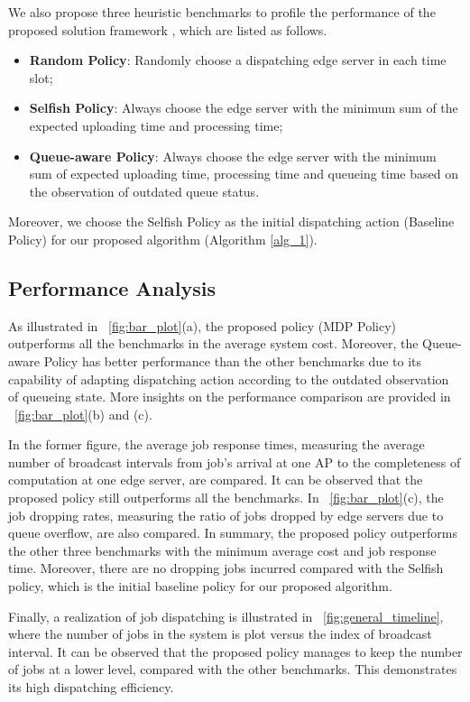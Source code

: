 We also propose three heuristic benchmarks to profile the performance of the proposed solution framework {\Dalgname}, which are listed as follows.
\begin{itemize}
    \item \textbf{Random Policy}:
            Randomly choose a dispatching edge server in each time slot; 
    \item \textbf{Selfish Policy}:
            Always choose the edge server with the minimum sum of the expected uploading time and processing time;
    \item \textbf{Queue-aware Policy}:
            Always choose the edge server with the minimum sum of expected uploading time, processing time and queueing time based on the observation of outdated queue status.
\end{itemize}
Moreover, we choose the Selfish Policy as the initial dispatching action (Baseline Policy) for our proposed algorithm (Algorithm \ref{alg_1}).

\subsection{Performance Analysis}
\label{subsec:chapter3-basic}
As illustrated in \figurename~\ref{fig:bar_plot}(a), the proposed policy (MDP Policy) outperforms all the benchmarks in the average system cost.
Moreover, the Queue-aware Policy has better performance than the other benchmarks due to its capability of adapting dispatching action according to the outdated observation of queueing state.
More insights on the performance comparison are provided in \figurename~\ref{fig:bar_plot}(b) and (c).

In the former figure, the average job response times, measuring the average number of broadcast intervals from job's arrival at one AP to the completeness of computation at one edge server, are compared.
It can be observed that the proposed policy still outperforms all the benchmarks.
In \figurename~\ref{fig:bar_plot}(c), the job dropping rates, measuring the ratio of jobs dropped by edge servers due to queue overflow, are also compared.
{In} summary, the proposed policy outperforms {the} other three benchmarks with the minimum average cost and job response time.
{Moreover, there {are} no dropping jobs incurred compared with the Selfish policy, which is the initial baseline policy for our proposed algorithm.}

Finally, a realization of job dispatching is illustrated in \figurename~\ref{fig:general_timeline}, where the number of jobs in the system is plot versus the index of broadcast interval.
It can be observed that the proposed policy {manages} to keep the number of jobs {at a} lower level, compared with the other benchmarks.
This demonstrates its high dispatching efficiency.


